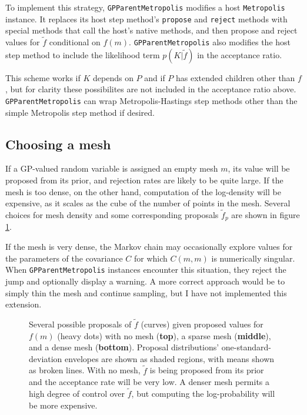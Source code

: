 \documentclass{report}
\begin{document}
To implement this strategy, \texttt{GPParentMetropolis} modifies a host \texttt{Metropolis} instance. It replaces its host step method's \texttt{propose} and \texttt{reject} methods with special methods that call the host's native methods, and then propose and reject values for $\tilde f$ conditional on $f(m)$. \texttt{GPParentMetropolis} also modifies the host step method to include the likelihood term $p(K|\tilde f)$ in the acceptance ratio.

This scheme works if $K$ depends on $P$ and if $P$ has extended children other than $f$, but for clarity these possibilites are not included in the acceptance ratio above. \texttt{GPParentMetropolis} can wrap Metropolis-Hastings step methods other than the simple Metropolis step method if desired.

\subsection{Choosing a mesh} If a GP-valued random variable is assigned an empty mesh $m$, its value will be proposed from its prior, and rejection rates are likely to be quite large. If the mesh is too dense, on the other hand, computation of the log-density will be expensive, as it scales as the cube of the number of points in the mesh. Several choices for mesh density and some corresponding proposals $\tilde f_p$ are shown in figure \ref{fig:meshpropose}.

If the mesh is very dense, the Markov chain may occasionally explore values for the parameters of the covariance $C$ for which $C(m,m)$ is numerically singular. When \texttt{GPParentMetropolis} instances encounter this situation, they reject the jump and optionally display a warning. A more correct approach would be to simply thin the mesh and continue sampling, but I have not implemented this extension.

\begin{figure}
    \centering
    \caption{Several possible proposals of $\tilde f$ (curves) given proposed values for $f(m)$ (heavy dots) with no mesh (\textbf{top}), a sparse mesh (\textbf{middle}), and a dense mesh (\textbf{bottom}). Proposal distributions' one-standard-deviation envelopes are shown as shaded regions, with means shown as broken lines. With no mesh, $\tilde f$ is being proposed from its prior and the acceptance rate will be very low. A denser mesh permits a high degree of control over $\tilde f$, but computing the log-probability will be more expensive.}
    \label{fig:meshpropose}
\end{figure}
\end{document}
